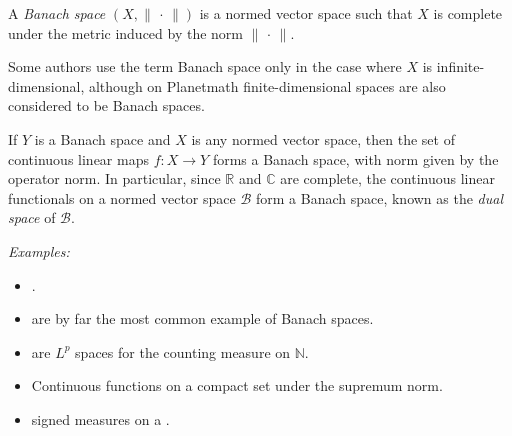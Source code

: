 \documentclass[12pt]{article}
\newcommand{\norm}[1]{\lVert #1 \rVert}
\begin{document}

A \emph{Banach space} $(X,\norm{\,\cdot\,})$ is a normed vector space such that $X$ is complete under the metric induced by the norm $\norm{\,\cdot\,}$.

Some authors use the term Banach space only in the case where $X$ is infinite-dimensional, although on Planetmath finite-dimensional spaces are also considered to be Banach spaces.

If $Y$ is a Banach space and $X$ is any normed vector space, then the set of continuous linear maps $f\colon X\to Y$ forms a Banach space, with norm given by the operator norm.  In particular, since $\mathbb{R}$ and $\mathbb{C}$ are complete, the continuous linear functionals on a normed vector space $\mathcal{B}$ form a Banach space, known as the \emph{dual space} of $\mathcal{B}$.

\emph{Examples:}
\begin{itemize}
\item {}.
\item {} are by far the most common example of Banach spaces.
\item {} are $L^p$ spaces for the counting measure on $\mathbb{N}$.
\item Continuous functions on a compact set under the supremum norm.
\item {} signed measures on a .
\end{itemize}
\end{document}
